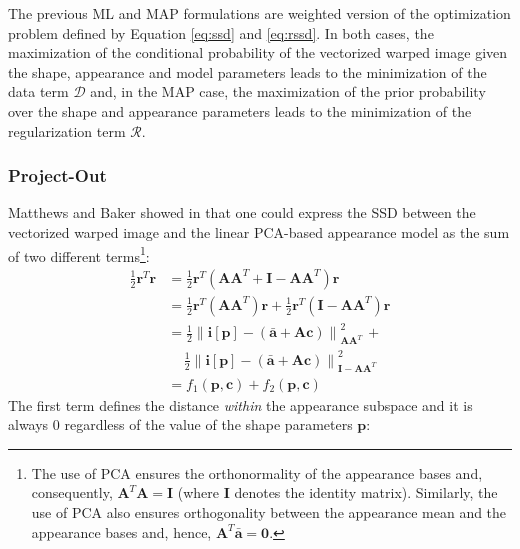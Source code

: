 The previous ML and MAP formulations are weighted version of the optimization problem defined by Equation \ref{eq:ssd} and \ref{eq:rssd}. In both cases, the maximization of the conditional probability of the vectorized warped image given the shape, appearance and model parameters leads to the minimization of the data term $\mathcal{D}$ and, in the MAP case, the maximization of the prior probability over the shape and appearance parameters leads to the minimization of the regularization term $\mathcal{R}$.

\subsubsection{Project-Out}
\label{sec:rpo}

Matthews and Baker showed in \cite{Matthews2004} that one could express the SSD between the vectorized warped image and the linear PCA-based appearance model as the sum of two different terms\footnote{The use of PCA ensures the orthonormality of the appearance bases and, consequently, $\mathbf{A}^T\mathbf{A} = \mathbf{I}$ (where $\mathbf{I} $ denotes the identity matrix). Similarly, the use of PCA also ensures orthogonality between the appearance mean and the appearance bases and, hence, $\mathbf{A}^T\bar{\mathbf{a}} =  \mathbf{0}$.}:
\begin{equation}
    \begin{aligned}
        \frac{1}{2}\mathbf{r}^T \mathbf{r} & = \frac{1}{2}\mathbf{r}^T (\mathbf{A}\mathbf{A}^T + \mathbf{I} - \mathbf{A}\mathbf{A}^T) \mathbf{r}
        \\
        & = \frac{1}{2}\mathbf{r}^T (\mathbf{A}\mathbf{A}^T) \mathbf{r} + \frac{1}{2}\mathbf{r}^T (\mathbf{I} - \mathbf{A}\mathbf{A}^T) \mathbf{r}
        \\
        & = \frac{1}{2}\left\| \mathbf{i}[\mathbf{p}] - \left( \bar{\mathbf{a}} + \mathbf{A} \mathbf{c} \right) \right\|_{\mathbf{A}\mathbf{A}^T}^2 \, + 
        \\
        & \quad \, \frac{1}{2}\left\| \mathbf{i}[\mathbf{p}] - \left( \bar{\mathbf{a}} + \mathbf{A} \mathbf{c} \right) \right\|_{\mathbf{I} - \mathbf{A}\mathbf{A}^T}^2 
        \\
        & = f_1(\mathbf{p}, \mathbf{c}) + f_2(\mathbf{p}, \mathbf{c})
    \label{eq:ssd_terms}
    \end{aligned}
\end{equation}
The first term defines the distance \emph{within} the appearance subspace and it is always $0$ regardless of the value of the shape parameters $\mathbf{p}$:
